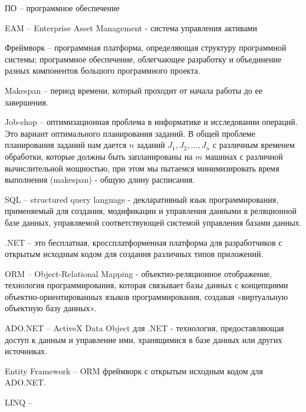 
ПО -- программное обеспечение

EAM -- Enterprise Asset Management - система управления активами

Фреймворк -- программная платформа, определяющая структуру программной системы; программное обеспечение, облегчающее разработку и объединение разных компонентов большого программного проекта.

Makespan -- период времени, который проходит от начала работы до ее завершения.

Job-shop -- оптимизационная проблема в информатике и исследовании операций. Это вариант оптимального планирования заданий. В общей проблеме планирования заданий нам дается $n$ заданий $J_{1}, J_{2}, ..., J_{n}$ с различным временем обработки, которые должны быть запланированы на $m$ машинах с различной вычислительной мощностью, при этом мы пытаемся минимизировать время выполнения (makespan) - общую длину расписания.

SQL -- structured query language - декларативный язык программирования, применяемый для создания, модификации и управления данными в реляционной базе данных, управляемой соответствующей системой управления базами данных.

.NET -- это бесплатная, кроссплатформенная платформа для разработчиков с открытым исходным кодом для создания различных типов приложений.

ORM -- Object-Relational Mapping - объектно-реляционное отображение, технология программирования, которая связывает базы данных с концепциями объектно-ориентированных языков программирования, создавая «виртуальную объектную базу данных».

ADO.NET -- ActiveX Data Object для .NET - технология, предоставляющая доступ к данным и управление ими, хранящимися в базе данных или других источниках.

Entity Framework -- ORM фреймворк с открытым исходным кодом для ADO.NET.

LINQ -- 
\clearpage
